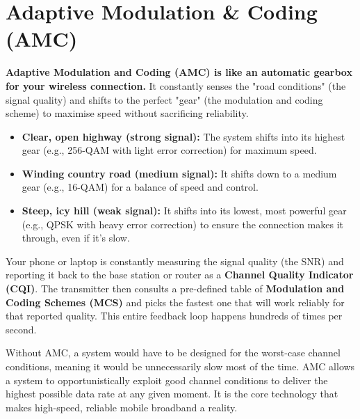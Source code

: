
\chapter{Adaptive Modulation \& Coding (AMC)}
\label{ch:amc}

\begin{nontechnical}
    \textbf{Adaptive Modulation and Coding (AMC) is like an automatic gearbox for your wireless connection.} It constantly senses the "road conditions" (the signal quality) and shifts to the perfect "gear" (the modulation and coding scheme) to maximise speed without sacrificing reliability.

    \begin{itemize}
        \item \textbf{Clear, open highway (strong signal):} The system shifts into its highest gear (e.g., 256-QAM with light error correction) for maximum speed.
        \item \textbf{Winding country road (medium signal):} It shifts down to a medium gear (e.g., 16-QAM) for a balance of speed and control.
        \item \textbf{Steep, icy hill (weak signal):} It shifts into its lowest, most powerful gear (e.g., QPSK with heavy error correction) to ensure the connection makes it through, even if it's slow.
    \end{itemize}

    Your phone or laptop is constantly measuring the signal quality (the SNR) and reporting it back to the base station or router as a \textbf{Channel Quality Indicator (CQI)}. The transmitter then consults a pre-defined table of \textbf{Modulation and Coding Schemes (MCS)} and picks the fastest one that will work reliably for that reported quality. This entire feedback loop happens hundreds of times per second.

    Without AMC, a system would have to be designed for the worst-case channel conditions, meaning it would be unnecessarily slow most of the time. AMC allows a system to opportunistically exploit good channel conditions to deliver the highest possible data rate at any given moment. It is the core technology that makes high-speed, reliable mobile broadband a reality.
\end{nontechnical}


